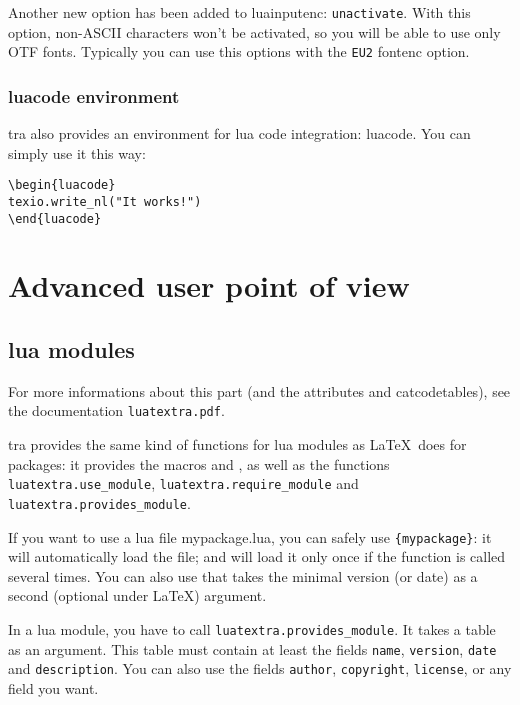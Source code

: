 \documentclass{article}
\begin{document}
Another new option has been added to \textsf{luainputenc}:
\texttt{unactivate}. With this option, non-ASCII characters won't be
activated, so you will be able to use only OTF fonts. Typically you can use
this options with the \texttt{EU2} \textsf{fontenc} option.

\subsubsection{luacode environment}

\LuaTeX tra also provides an environment for lua code integration:
\textsf{luacode}. You can simply use it this way:

\begin{verbatim}
\begin{luacode}
texio.write_nl("It works!")
\end{luacode}
\end{verbatim}

\section{Advanced user point of view}

\subsection{lua modules}

For more informations about this part (and the attributes and catcodetables),
see the documentation \texttt{luatextra.pdf}.

\LuaTeX tra provides the same kind of functions for lua modules as \LaTeX\
does for packages: it provides the macros \texttt{\string\luaUseModule} and
\texttt{\string\luaRequireModule}, as well as the functions
\texttt{luatextra.use\_module}, \texttt{luatextra.require\_module} and
\texttt{luatextra.provides\_module}.

If you want to use a lua file mypackage.lua, you can safely use
\texttt{\string\luaUseModule\{mypackage\}}: it will automatically load the
file; and will load it only once if the function is called several times. You
can also use \texttt{\string\luaRequireModule} that takes the minimal version
(or date) as a second (optional under \LaTeX ) argument.

In a lua module, you have to call \texttt{luatextra.provides\_module}. It
takes a table as an argument. This table must contain at least the fields
\texttt{name}, \texttt{version}, \texttt{date} and \texttt{description}. You
can also use the fields \texttt{author}, \texttt{copyright}, \texttt{license},
or any field you want.
\end{document}
